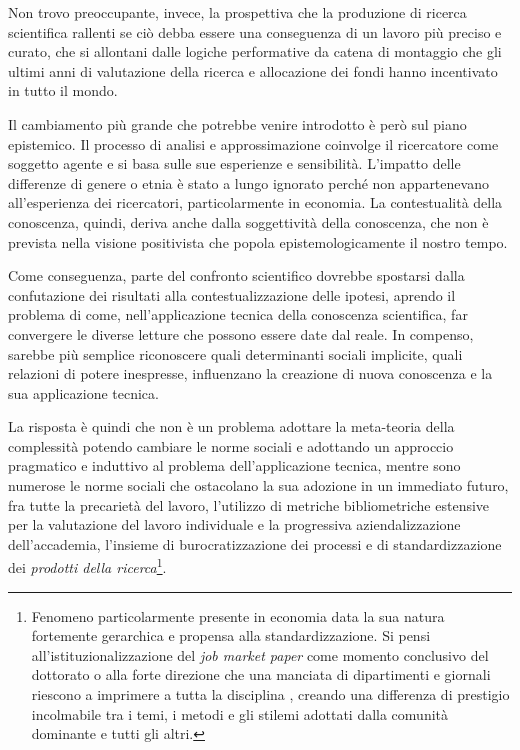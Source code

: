 \documentclass[a4paper, headings=standardclasses]{scrartcl}
\begin{document}
Non trovo preoccupante, invece, la prospettiva che la produzione di ricerca scientifica rallenti se ciò debba essere una conseguenza di un lavoro più preciso e curato, che si allontani dalle logiche performative da catena di montaggio che gli ultimi anni di valutazione della ricerca e allocazione dei fondi hanno incentivato in tutto il mondo.

Il cambiamento più grande che potrebbe venire introdotto è però sul piano epistemico.
Il processo di analisi e approssimazione coinvolge il ricercatore come soggetto agente e si basa sulle sue esperienze e sensibilità.
L'impatto delle differenze di genere o etnia è stato a lungo ignorato perché non appartenevano all'esperienza dei ricercatori, particolarmente in economia.
La contestualità della conoscenza, quindi, deriva anche dalla soggettività della conoscenza, che non è prevista nella visione positivista che popola epistemologicamente il nostro tempo.

Come conseguenza, parte del confronto scientifico dovrebbe spostarsi dalla confutazione dei risultati alla contestualizzazione delle ipotesi, aprendo il problema di come, nell'applicazione tecnica della conoscenza scientifica, far convergere le diverse letture che possono essere date dal reale.
In compenso, sarebbe più semplice riconoscere quali determinanti sociali implicite, quali relazioni di potere inespresse, influenzano la creazione di nuova conoscenza e la sua applicazione tecnica.

La risposta è quindi che non è un problema adottare la meta-teoria della complessità potendo cambiare le norme sociali e adottando un approccio pragmatico e induttivo al problema dell'applicazione tecnica, mentre sono numerose le norme sociali che ostacolano la sua adozione in un immediato futuro, fra tutte la precarietà del lavoro, l'utilizzo di metriche bibliometriche estensive per la valutazione del lavoro individuale e la progressiva aziendalizzazione dell'accademia, l'insieme di burocratizzazione dei processi e di standardizzazione dei \textit{prodotti della ricerca}\footnote{Fenomeno particolarmente presente in economia data la sua natura fortemente gerarchica e propensa alla standardizzazione. Si pensi all'istituzionalizzazione del \textit{job market paper} come momento conclusivo del dottorato o alla forte direzione che una manciata di dipartimenti e giornali riescono a imprimere a tutta la disciplina \parencite{heckman2020, aistleitner2023, baccini2023a}, creando una differenza di prestigio incolmabile tra i temi, i metodi e gli stilemi adottati dalla comunità dominante e tutti gli altri.}.
\end{document}
